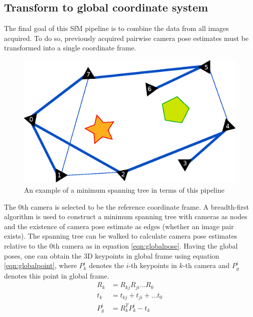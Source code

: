 \documentclass[10pt,twocolumn,letterpaper]{article}
\begin{document}

\subsection{Transform to global coordinate system}

The final goal of this SfM pipeline is to combine the data from all images
acquired. To do so, previously acquired pairwise camera pose estimates must
be transformed into a single coordinate frame.

\begin{figure}[t]
\begin{center}
   \includegraphics[width=0.9\linewidth]{figures/spanning_tree.eps}
\end{center}
\caption{An example of a minimum spanning tree in terms of this pipeline}
\label{fig:spanning}
\end{figure}

The 0th camera is selected to be the reference coordinate frame. A breadth-first
algorithm is used to construct a minimum spanning tree with cameras as nodes and
the existence of camera pose estimate as edges (whether an image pair exists).
The spanning tree can be walked to calculate camera pose estimates relative to
the 0th camera as in equation \ref{eqn:globalpose}. Having the global poses, one can obtain the 3D keypoints in global frame using equation \ref{eqn:globalpoint}, where $P^{i}_{k}$ denotes the $i$-th keypoints in $k$-th camera and $P^{i}_{g}$ denotes this point in global frame.
\begin{align}\label{eqn:globalpose}
R_{k} &= R_{kj}R_{ji}\ldots R_{0}\nonumber\\
t_{k} &= t_{kj}+t_{ji}+\ldots t_{0}\\
P^{i}_{g} &= R_{k}^T P^{i}_{k} - t_{k} \label{eqn:globalpoint}
\end{align}
\end{document}
